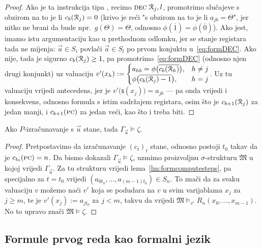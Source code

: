 \begin{proof}
Ako je ta instrukcija tipa \dec, recimo $\textsc{dec}\;\mathcal R_{j},l$, promotrimo slučajeve s obzirom na to je li $c_b(\mathcal R_{j})=0$ (krivo je reći "s obzirom na to je li $a_{jb}=\Theta$", jer nitko ne brani da bude npr.\ $g(\Theta)=\Theta$, odnosno $\phi(\overline1)=\phi(\overline0)$). Ako jest, imamo istu argumentaciju kao u prethodnom odlomku, jer se stanje registara tada ne mijenja: $\vec a\in S_i$ povlači $\vec a\in S_l$ po prvom konjuktu u~\eqref{eq:formDEC}. Ako nije, tada je sigurno $c_b(\mathcal R_{j})\ge1$, pa promotrimo~\eqref{eq:formDEC} (odnosno njen drugi konjunkt) uz valuaciju
$v'(x_h):=\begin{cases}
a_{hb}=\phi\bigl(\overline{c_b(\mathcal R_{h})}\bigr),&h\not=j\\
\phi\bigl(\overline{c_b(\mathcal R_{j})-1}\bigr),&h=j
\end{cases}$.
Uz tu valuaciju vrijedi antecedens, jer je $v'\bigl(\mathsf s(x_j)\bigr)=a_{jb}$ --- pa onda vrijedi i konsekvens, odnosno formula s istim sadržajem registara, osim što je $c_{b+1}(\mathcal R_{j})$ za jedan manji, i $c_{b+1}(\textsc{pc})$ za jedan veći, kao što i treba biti.
\end{proof}

\begin{propozicija}[{name=[zaustavljanje povlači zaključivanje]}]\label{pp:stop>models}
Ako $P$-izračunavanje s $\vec u$ stane, tada $\Gamma_{\vec u}\models\zeta$.
\end{propozicija}
\begin{proof}
Pretpostavimo da izračunavanje $(c_t)_t$ stane, odnosno postoji $t_0$ takav da je $c_{t_0}(\textsc{pc})=n$. Da bismo dokazali $\Gamma_{\vec u}\models\zeta$, uzmimo proizvoljnu $\sigma$-strukturu $\mathfrak M$ u kojoj vrijedi $\Gamma_{\vec u}$. Za tu strukturu vrijedi lema~\ref{lm:formcomputesteps}, pa specijalno za $t=t_0$ vrijedi $(a_{0t_0},\dotsc,a_{(m-1)t_0})\in S_n$. To znači da za svaku valuaciju $v$ možemo naći $v'$ koja se podudara na $v$ u svim varijablama $x_j$ za $j\ge m$, te je $v'(x_j):=a_{jt_0}$ za $j<m$, takvu da vrijedi $\mathfrak M\models_{v'}R_n(x_0,\dotsc,x_{m-1})$. No to upravo znači $\mathfrak M\models\zeta$.
\end{proof}


\subsection{Formule prvog reda kao formalni jezik}

